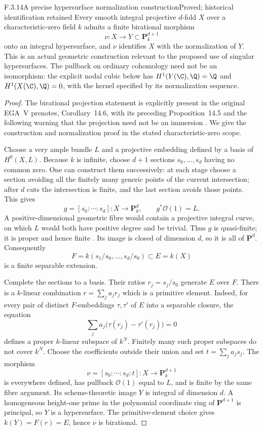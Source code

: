 \begin{result}{F.3.14}{A precise hypersurface normalization construction}{Proved; historical identification retained}
Every smooth integral projective $d$-fold $X$ over a characteristic-zero field $k$ admits a finite birational morphism
\[
 \nu:X\longrightarrow Y\subset\mathbf P_k^{d+1}
\]
onto an integral hypersurface, and $\nu$ identifies $X$ with the normalization of $Y$.
This is an actual geometric construction relevant to the proposed use of singular hypersurfaces. The pullback on ordinary cohomology need not be an isomorphism: the explicit nodal cubic below has $H^1(Y(\C),\Q)=\Q$ and $H^1(X(\C),\Q)=0$, with the kernel specified by its normalization sequence.
\end{result}
\begin{proof}
The birational projection statement is explicitly present in the original EGA~V prenotes, Corollary~14.6, with its preceding Proposition~14.5 and the following warning that the projection need not be an immersion \cite[original scan p.89]{AuditGrothendieckEGAVOriginal}. We give the construction and normalization proof in the stated characteristic-zero scope.

Choose a very ample bundle $L$ and a projective embedding defined by a basis of $H^0(X,L)$. Because $k$ is infinite, choose $d+1$ sections $s_0,\ldots,s_d$ having no common zero. One can construct them successively: at each stage choose a section avoiding all the finitely many generic points of the current intersection; after $d$ cuts the intersection is finite, and the last section avoids those points. This gives
\[
 g=[s_0:\cdots:s_d]:X\longrightarrow\mathbf P_k^d,
 \qquad g^*\mathcal O(1)=L.
\]
A positive-dimensional geometric fibre would contain a projective integral curve, on which $L$ would both have positive degree and be trivial. Thus $g$ is quasi-finite; it is proper and hence finite \cite[Tag 02LS, Lemma 37.44.1]{AuditStacksFiniteNormalization}. Its image is closed of dimension $d$, so it is all of $\mathbf P^d$. Consequently
\[
 F=k(s_1/s_0,\ldots,s_d/s_0)\subset E=k(X)
\]
is a finite separable extension.

Complete the sections to a basis. Their ratios $r_j=s_j/s_0$ generate $E$ over $F$. There is a $k$-linear combination $r=\sum_j a_jr_j$ which is a primitive element. Indeed, for every pair of distinct $F$-embeddings $\tau,\tau'$ of $E$ into a separable closure, the equation
\[
 \sum_j a_j\bigl(\tau(r_j)-\tau'(r_j)\bigr)=0
\]
defines a proper $k$-linear subspace of $k^N$. Finitely many such proper subspaces do not cover $k^N$. Choose the coefficients outside their union and set $t=\sum_j a_js_j$. The morphism
\[
 \nu=[s_0:\cdots:s_d:t]:X\longrightarrow\mathbf P_k^{d+1}
\]
is everywhere defined, has pullback $\mathcal O(1)$ equal to $L$, and is finite by the same fibre argument. Its scheme-theoretic image $Y$ is integral of dimension $d$. A homogeneous height-one prime in the polynomial coordinate ring of $\mathbf P^{d+1}$ is principal, so $Y$ is a hypersurface. The primitive-element choice gives $k(Y)=F(r)=E$, hence $\nu$ is birational.


\end{proof}
